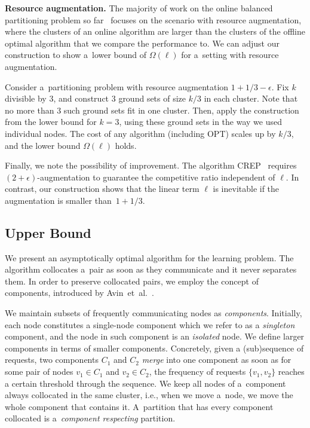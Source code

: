 \documentclass[a4paper,anonymous,USenglish]{lipics-v2019}
\newcommand{\OPT}{\textsc{OPT}\xspace}
\begin{document}
\medskip

\noindent
\textbf{Resource augmentation.}
The majority of work on the online balanced partitioning problem so far~\cite{repartition-disc,sigmetrics19_partitioning} focuses on the scenario with resource augmentation, where the clusters of an online algorithm are larger than the clusters of the offline optimal algorithm that we compare the performance to.
We can adjust our construction to show a~lower bound of $\Omega(\ell)$ for a~setting with resource augmentation.

Consider a~partitioning problem with resource augmentation $1+1/3-\epsilon$.
Fix $k$ divisible by $3$, and construct $3$ ground sets of size $k/3$ in each cluster.
Note that no more than $3$ such ground sets fit in one cluster.
Then, apply the construction from the lower bound for $k=3$, using these ground sets in the way we used individual nodes.
The cost of any algorithm (including \OPT) scales up by $k/3$, and the lower bound $\Omega(\ell)$ holds.

Finally, we note the possibility of improvement. The algorithm CREP~\cite{repartition-disc} requires $(2+\epsilon)$-augmentation to guarantee the competitive ratio independent of $\ell$.
In contrast, our construction shows that the linear term $\ell$ is inevitable if the augmentation is smaller than~$1+1/3$.

\subsection{Upper Bound}
\label{sec:ppl}

We present an asymptotically optimal algorithm for the learning problem.
The algorithm  collocates  a~pair as soon as they communicate and it never separates them.
In order to preserve collocated pairs,
we employ the concept of components,
introduced by Avin~et~al.~\cite{repartition-disc}.

We maintain subsets of frequently communicating nodes as \emph{components}.
Initially,
each node constitutes a single-node component which we refer to as a \emph{singleton} component, 
and the node in such component is an \emph{isolated} node.
We define larger components in terms of smaller components.
Concretely,
given a (sub)sequence of requests,
two components $C_1$ and $C_2$
 \emph{merge} into one component as soon as
 for some pair of nodes $v_1 \in C_1$ and $v_2 \in C_2$,
the frequency of requests $\{v_1,v_2\}$ reaches a certain threshold through the sequence.
We keep all nodes of a~component always collocated in the same cluster,
i.e., when we  move a~node,
we move the whole component that contains it.
A~partition that has every component collocated 
is a~\emph{component respecting} partition.
\end{document}
